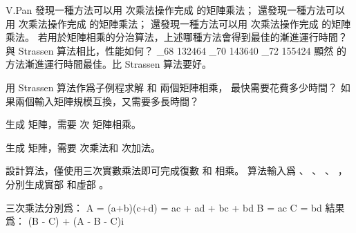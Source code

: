 \startEXERCISE
V.Pan 發現一種方法可以用  次乘法操作完成  的矩陣乘法；
還發現一種方法可以用  次乘法操作完成  的矩陣乘法；
還發現一種方法可以用  次乘法操作完成  的矩陣乘法。
若用於矩陣相乘的分治算法，上述哪種方法會得到最佳的漸進運行時間？
與 Strassen 算法相比，性能如何？
\stopEXERCISE
\startANSWER
\startformula\startalign
\log_{68} 132464  \NR
\log_{70} 143640  \NR
\log_{72} 155424  \NR
\stopalign\stopformula
顯然  的方法漸進運行時間最佳。比 Strassen 算法要好。
\stopANSWER

\startEXERCISE
用 Strassen 算法作爲子例程求解  和  兩個矩陣相乘，
最快需要花費多少時間？
如果兩個輸入矩陣規模互換，又需要多長時間？
\stopEXERCISE

\startANSWER
{} 生成  矩陣，需要  次  矩陣相乘。

 生成  矩陣，需要  次乘法和  次加法。
\stopANSWER

\startEXERCISE
設計算法，僅使用三次實數乘法即可完成復數  和  相乘。
算法輸入爲 、 、 、 ，分別生成實部  和虛部 。
\stopEXERCISE

\startANSWER
三次乘法分別爲：
\startformula\startalign
\NC A \NC = (a+b)(c+d) = ac + ad + bc + bd \NR
\NC B \NC = ac \NR
\NC C \NC = bd \NR
\stopalign\stopformula
結果爲：
\startformula
(B - C) + (A - B - C)i
\stopformula
\stopANSWER

\stopsection
